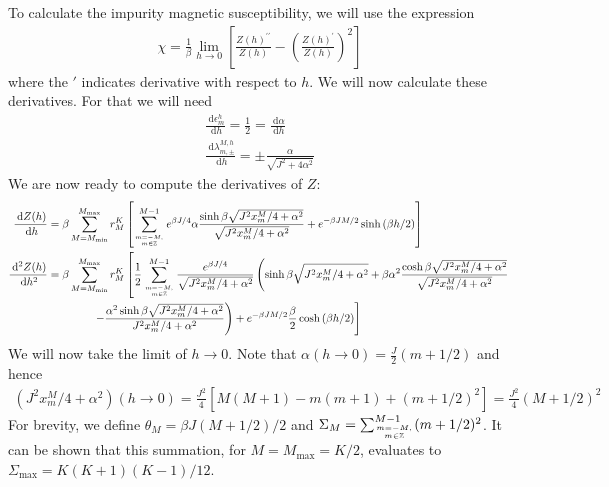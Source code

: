 \documentclass[12pt]{revtex4-2}
\begin{document}
To calculate the impurity magnetic susceptibility, we will use the expression
\begin{align}
	\chi = \frac{1}{\beta}\lim_{h \to 0}\left[\frac{Z(h)^{\prime\prime}}{Z(h)} - \left(\frac{Z(h)^{\prime}}{Z(h)}\right)^2 \right] 
\end{align}
where the \(\prime\) indicates derivative with respect to \(h\). We will now calculate these derivatives. For that we will need
\begin{gather}
	\frac{\:\mathrm{d}\epsilon_m^h}{\:\mathrm{d}h} = \frac{1}{2} = \frac{\:\mathrm{d}\alpha}{\:\mathrm{d}h}\\
	\frac{\:\mathrm{d}\lambda_{m,\pm}^{M, h}}{\:\mathrm{d}h} = \pm\frac{\alpha}{\sqrt{J^2 + 4\alpha^2}}
\end{gather}
We are now ready to compute the derivatives of \(Z\):
\begin{align}
	\frac{\:\mathrm{d}Z(h)}{\:\mathrm{d}h} &= \beta\sum_{M=M_\text{min}}^{M_\text{max}}r^K_M\left[\sum_{m=-M, \atop{m\in \mathbb{Z}}}^{M-1}e^{\beta J/4}\alpha\frac{\sinh \beta\sqrt{J^2x^M_m/4 + \alpha^2} }{\sqrt{J^2x^M_m/4 + \alpha^2}} + e^{-\beta JM/2}\sinh \left(\beta h/2\right)\right] \\
	\frac{\:\mathrm{d}^2Z(h)}{\:\mathrm{d}h^2} &= \beta\sum_{M=M_\text{min}}^{M_\text{max}}r^K_M\left[\frac{1}{2}\sum_{m=-M, \atop{m\in \mathbb{Z}}}^{M-1}\frac{e^{\beta J/4}}{\sqrt{J^2x^M_m/4 + \alpha^2}}\left(\sinh \beta\sqrt{J^2x^M_m/4 + \alpha^2} + \beta\alpha^2 \frac{\cosh\beta\sqrt{J^2x^M_m/4 + \alpha^2}}{\sqrt{J^2x^M_m/4 + \alpha^2}}\right.\right.\\
						   &\quad \quad\quad \quad\left.\left. - \frac{\alpha^2 \sinh \beta\sqrt{J^2x^M_m/4 + \alpha^2}}{J^2x^M_m/4 + \alpha^2}\right) + e^{-\beta JM/2}\frac{\beta}{2}\cosh \left(\beta h/2\right)\right] \\
\end{align}
We will now take the limit of \(h \to 0\). Note that \(\alpha(h\to 0)=\frac{J}{2}(m+1/2)\) and hence 
\begin{align}
	(J^2x^M_m/4 + \alpha^2)(h \to 0) = \frac{J^2}{4}\left[M(M+1) - m(m+1) + (m+1/2)^2\right] = \frac{J^2}{4}\left( M + 1/2 \right)^2
\end{align}
For brevity, we define \(\theta_M = \beta J (M+1/2)/2\) and \(\Sigma_M = \sum_{m=-M, \atop{m\in \mathbb{Z}}}^{M-1}(m+1/2)^2\). It can be shown that this summation, for \(M=M_\text{max}=K/2\), evaluates to \(\Sigma_\text{max} = K(K+1)(K-1)/12\).
\end{document}
